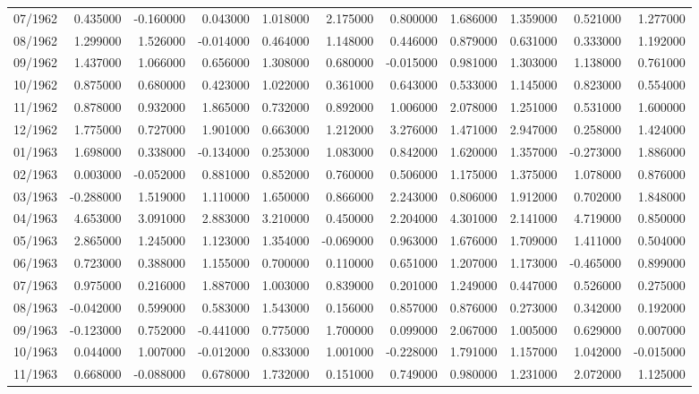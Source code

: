 \begin{tabular}{lrrrrrrrrrr}
07/1962 & 0.435000 & -0.160000 & 0.043000 & 1.018000 & 2.175000 & 0.800000 & 1.686000 & 1.359000 & 0.521000 & 1.277000 \\
08/1962 & 1.299000 & 1.526000 & -0.014000 & 0.464000 & 1.148000 & 0.446000 & 0.879000 & 0.631000 & 0.333000 & 1.192000 \\
09/1962 & 1.437000 & 1.066000 & 0.656000 & 1.308000 & 0.680000 & -0.015000 & 0.981000 & 1.303000 & 1.138000 & 0.761000 \\
10/1962 & 0.875000 & 0.680000 & 0.423000 & 1.022000 & 0.361000 & 0.643000 & 0.533000 & 1.145000 & 0.823000 & 0.554000 \\
11/1962 & 0.878000 & 0.932000 & 1.865000 & 0.732000 & 0.892000 & 1.006000 & 2.078000 & 1.251000 & 0.531000 & 1.600000 \\
12/1962 & 1.775000 & 0.727000 & 1.901000 & 0.663000 & 1.212000 & 3.276000 & 1.471000 & 2.947000 & 0.258000 & 1.424000 \\
01/1963 & 1.698000 & 0.338000 & -0.134000 & 0.253000 & 1.083000 & 0.842000 & 1.620000 & 1.357000 & -0.273000 & 1.886000 \\
02/1963 & 0.003000 & -0.052000 & 0.881000 & 0.852000 & 0.760000 & 0.506000 & 1.175000 & 1.375000 & 1.078000 & 0.876000 \\
03/1963 & -0.288000 & 1.519000 & 1.110000 & 1.650000 & 0.866000 & 2.243000 & 0.806000 & 1.912000 & 0.702000 & 1.848000 \\
04/1963 & 4.653000 & 3.091000 & 2.883000 & 3.210000 & 0.450000 & 2.204000 & 4.301000 & 2.141000 & 4.719000 & 0.850000 \\
05/1963 & 2.865000 & 1.245000 & 1.123000 & 1.354000 & -0.069000 & 0.963000 & 1.676000 & 1.709000 & 1.411000 & 0.504000 \\
06/1963 & 0.723000 & 0.388000 & 1.155000 & 0.700000 & 0.110000 & 0.651000 & 1.207000 & 1.173000 & -0.465000 & 0.899000 \\
07/1963 & 0.975000 & 0.216000 & 1.887000 & 1.003000 & 0.839000 & 0.201000 & 1.249000 & 0.447000 & 0.526000 & 0.275000 \\
08/1963 & -0.042000 & 0.599000 & 0.583000 & 1.543000 & 0.156000 & 0.857000 & 0.876000 & 0.273000 & 0.342000 & 0.192000 \\
09/1963 & -0.123000 & 0.752000 & -0.441000 & 0.775000 & 1.700000 & 0.099000 & 2.067000 & 1.005000 & 0.629000 & 0.007000 \\
10/1963 & 0.044000 & 1.007000 & -0.012000 & 0.833000 & 1.001000 & -0.228000 & 1.791000 & 1.157000 & 1.042000 & -0.015000 \\
11/1963 & 0.668000 & -0.088000 & 0.678000 & 1.732000 & 0.151000 & 0.749000 & 0.980000 & 1.231000 & 2.072000 & 1.125000 \\

\end{tabular}
